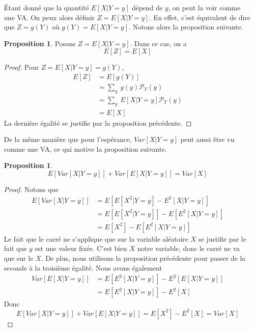 \documentclass[a4paper,12pt]{report}
\theoremstyle{definition}
\renewcommand{\(}{\left(}
\renewcommand{\)}{\right)}
\renewcommand{\P}{\mathcal{P}}
\newtheorem{prop}[thm]{Proposition}
\begin{document}
        Étant donné que la quantité $E[X|Y=y]$ dépend de $y$, on peut la voir comme une VA. On peux alors définir $Z = E[X|Y=y]$. En effet, c'est équivalent de dire que $Z = g(Y)$ où $g(Y) = E[X|Y=y]$. Notons alors la proposition suivante.
        
        \begin{leftbar}
        \begin{prop}
        Posons $Z = E[X|Y=y]$. Dans ce cas, on a 
            $$E[Z] = E[X]$$
        \end{prop}
        \end{leftbar}
        
        \begin{proof}
            Pour $Z = E[X|Y=y] = g(Y)$,
            \begin{align*}
                E[Z] &= E[g(Y)] \\
                &= \sum_y~g(y)\P_Y(y) \\
                &= \sum_y~E[X|Y=y]\P_Y(y) \\
                &= E[X]
            \end{align*}
            La dernière égalité se justifie par la proposition précédente.
        \end{proof}
            
        De la même manière que pour l'espérance, $Var[X|Y=y]$ peut aussi être vu comme une VA, ce qui motive la proposition suivante.
        
        \begin{leftbar}
        \begin{prop}
            $$E[Var[X|Y=y]]+Var[E[X|Y=y]] = Var[X]$$
        \end{prop}
        \end{leftbar}
        
        \begin{proof}
            Notons que
            \begin{align*}
                E[Var[X|Y=y]] &=  E[E[X^2|Y=y]-E^2[X|Y=y]] \\
                &= E[E[X^2|Y=y]]-E[E^2[X|Y=y]] \\
                &= E[X^2]-E[E^2[X|Y=y]]
            \end{align*}
            Le fait que le carré ne s'applique que sur la variable aléatoire $X$ se justifie par le fait que $y$ est une valeur fixée. C'est bien $X$ notre variable, donc le carré ne va que sur le $X$. De plus, nous utilisons la proposition précédente pour passer de la seconde à la troisième égalité. Nous avons également
            \begin{align*}
                Var[E[X|Y=y]] &= E[E^2[X|Y=y]]-E^2[E[X|Y=y]] \\
                &= E[E^2[X|Y=y]]-E^2[X] 
            \end{align*}
            Donc 
            $$E[Var[X|Y=y]]+Var[E[X|Y=y]] = E[X^2] - E^2[X] = Var[X]$$
        \end{proof}
        
\end{document}
